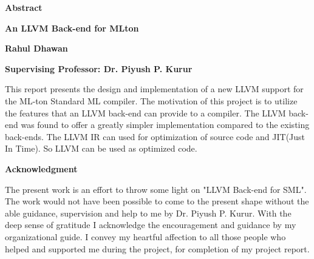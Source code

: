 \documentclass[openany]{book}
\begin{document}
\begin{center}
    
    \huge{\textbf{Abstract}}
 
    \vspace{0.4cm}
    \large
    \textbf{An LLVM Back-end for MLton}
    
    \vspace{0.4cm}
    \textbf{Rahul Dhawan}
 
    \vspace{0.4cm}
    \textbf{Supervising Professor: Dr. Piyush P. Kurur }
    
    \vspace{1.0cm}
    \justify
    This report presents the design and implementation of a new LLVM support for the ML-ton Standard ML compiler. The motivation of this project is to utilize the features that an LLVM back-end can provide to a compiler.  The LLVM back-end was found to offer a greatly simpler implementation compared to the existing back-ends. The LLVM IR can used for optimization of source code and JIT(Just In Time). So LLVM can be used as optimized code. \newpage
\end{center}

\thispagestyle{plain}
\begin{center}
	
	\huge{\textbf{Acknowledgment}}
	\large
	\vspace{0.4cm}
	
	\vspace{1.0cm}
	The present work is an effort to throw some light on "LLVM Back-end for SML". The work would not have been possible to come to the present shape without the able guidance, supervision and help to me by Dr. Piyush P. Kurur. With the deep sense of gratitude I acknowledge the encouragement and guidance by my organizational guide. I convey my heartful affection to all those people who helped and supported me during the project, for completion of my project report.   
\end{center}

\hypersetup{
	colorlinks,
	citecolor=black,
	filecolor=black,
	linkcolor=black,
	urlcolor=black
}

\tableofcontents

\listoffigures

\listoftables
\end{document}
